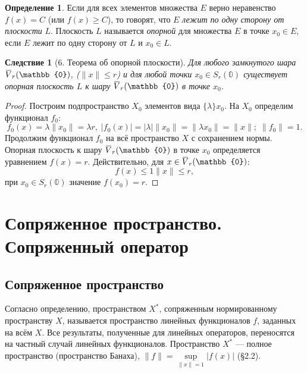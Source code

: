 \documentclass[12pt,a4paper,titlepage,oneside]{book}
\newcommand{\overbar}[1]{\mkern 1.5mu\overline{\mkern-1.5mu#1\mkern-1.5mu}\mkern 1.5mu}
\theoremstyle{definition}
\newtheorem*{definition}{Определение}
\theoremstyle{plain}
\theoremstyle{break}
\theoremstyle{remark}
\theoremstyle{remark}
\theoremstyle{remark}
\theoremstyle{remark}
\theoremstyle{plain}
\theoremstyle{plain}
\newtheorem*{corollary}{Следствие}
\begin{document}
\begin{definition}
Если для всех элементов множества $E$ верно неравенство $f(x)=C$ (или $f(x) \geqslant C$), то говорят, что $E$ \textit{лежит по одну сторону от плоскости} $L$. Плоскость $L$ называется \textit{опорной} для множества $E$ в точке $x_0 \in E$, если $E$ лежит по одну сторону от $L$ и $x_0 \in L$.
\end{definition}

\begin{corollary}[6. Теорема об опорной плоскости]
Для любого замкнутого шара $\overbar{V}_r(\mathbb{0})$, ($\lVert x \rVert \leqslant r$) и для любой точки $x_0 \in S_r(\mathbb{0})$ существует опорная плоскость $L$ к шару $\overbar{V}_r(\mathbb{0})$ в точке $x_0$.
\end{corollary}

\begin{proof}
Построим подпространство $X_0$ элементов вида $\{ \lambda \}x_0$. На $X_0$ определим функционал $f_0$:
\begin{equation*}
f_0(x)=\lambda \lVert x_0 \rVert = \lambda r, \;  \vert f_0(x) \vert = \vert \lambda \vert \lVert x_0 \rVert=\lVert \lambda x_0 \rVert=\lVert x \rVert; \; \lVert f_0 \rVert=1.
\end{equation*}
Продолжим функционал $f_0$ на всё пространство $X$ с сохранением нормы. Опорная плоскость к шару $\overbar{V}_r(\mathbb{0})$ в точке $x_0$ определяется уравнением $f(x)=r$. Действительно, для $x \in \overbar{V}_r(\mathbb{0})$:
\begin{equation*}
f(x)\leqslant 1 \lVert x \rVert \leqslant r,
\end{equation*}
при $x_0 \in S_r(\mathbb{0})$ значение $f(x_0)=r$.
\qedhere
\end{proof}

\chapter{Сопряженное пространство. Сопряженный оператор}

\section{Сопряженное пространство}

Согласно определению, пространством $X^*$, сопряженным нормированному пространству $X$, называется пространство линейных функционалов $f$, заданных на всём $X$. Все результаты, полученные для линейных операторов, переносятся на частный случай линейных функционалов.
Пространство $X^*$ --- полное пространство (пространство Банаха), $\lVert f\rVert = \sup\limits_{\lVert x\rVert = 1}\lvert f(x)\rvert$ (\S 2.2).
\end{document}
